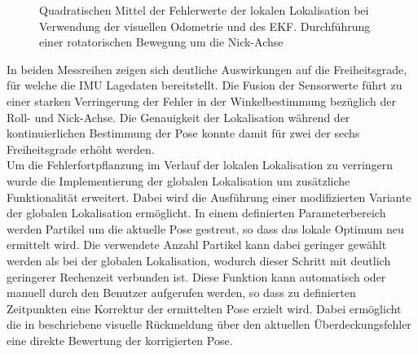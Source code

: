 \begin{figure}

\caption{Quadratischen Mittel der Fehlerwerte der lokalen Lokalisation bei Verwendung der visuellen Odometrie und des EKF. Durchführung einer rotatorischen Bewegung um die Nick-Achse}
\label{fig.loc_loc_rot_ekf_pitch}
\end{figure}


In beiden Messreihen zeigen sich deutliche Auswirkungen auf die Freiheitsgrade, für welche die IMU Lagedaten bereitstellt. Die Fusion der Sensorwerte führt zu einer starken Verringerung der Fehler in der Winkelbestimmung bezüglich der Roll- und Nick-Achse. Die Genauigkeit der Lokalisation während der kontinuierlichen Bestimmung der Pose konnte damit für zwei der sechs Freiheitsgrade erhöht werden.\\

Um die Fehlerfortpflanzung im Verlauf der lokalen Lokalisation zu verringern wurde die Implementierung der globalen Lokalisation um zusätzliche Funktionalität erweitert. Dabei wird die Ausführung einer modifizierten Variante der globalen Lokalisation ermöglicht. In einem definierten Parameterbereich werden Partikel um die aktuelle Pose gestreut, so dass das lokale Optimum neu ermittelt wird. Die verwendete Anzahl Partikel kann dabei geringer gewählt werden als bei der globalen Lokalisation, wodurch dieser Schritt mit deutlich geringerer Rechenzeit verbunden ist. Diese Funktion kann automatisch oder manuell durch den Benutzer aufgerufen werden, so dass zu definierten Zeitpunkten eine Korrektur der ermittelten Pose erzielt wird. Dabei ermöglicht die in  beschriebene visuelle Rückmeldung über den aktuellen Überdeckungsfehler eine direkte Bewertung der korrigierten Pose.


\prever{
}



